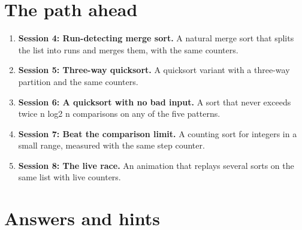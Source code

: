\documentclass[11pt,a4paper]{article}
\begin{document}
\section{The path ahead}
\begin{enumerate}[nosep]
\item \textbf{Session 4: Run-detecting merge sort.} A natural merge sort that splits the list into runs and merges them, with the same counters.
\item \textbf{Session 5: Three-way quicksort.} A quicksort variant with a three-way partition and the same counters.
\item \textbf{Session 6: A quicksort with no bad input.} A sort that never exceeds twice n log2 n comparisons on any of the five patterns.
\item \textbf{Session 7: Beat the comparison limit.} A counting sort for integers in a small range, measured with the same step counter.
\item \textbf{Session 8: The live race.} An animation that replays several sorts on the same list with live counters.
\end{enumerate}

\section{Answers and hints}
\end{document}
